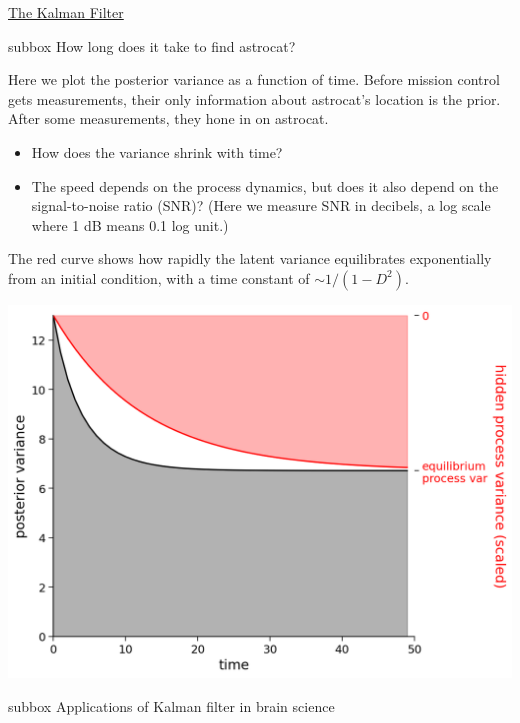 \begin{textbox}{\href{http://instructor.compneuro.neuromatch.io/tutorials/W3D2_HiddenDynamics/instructor/W3D2_Tutorial3.html}{The Kalman Filter }   }

\begin{subbox}{subbox}{ How long does it take to find astrocat?}
\scriptsize

Here we plot the posterior variance as a function of time. Before mission control gets measurements, their only information about astrocat's location is the prior. After some measurements, they hone in on astrocat.
\begin{itemize}
    \item 
 How does the variance shrink with time?
\item The speed depends on the process dynamics, but does it also depend on the signal-to-noise ratio (SNR)? (Here we measure SNR in decibels, a log scale where 1 dB means 0.1 log unit.)
\end{itemize}

The red curve shows how rapidly the latent variance equilibrates exponentially from an initial condition, with a time constant of $\sim 1/(1-D^2)$. 

\begin{center}
    
\includegraphics[scale=0.25]{Figures/HD/HD_Figure9.png}
\end{center}

\end{subbox}
\begin{subbox}{subbox}{ Applications of Kalman filter in brain science}
\scriptsize



\end{subbox}
\end{textbox}
